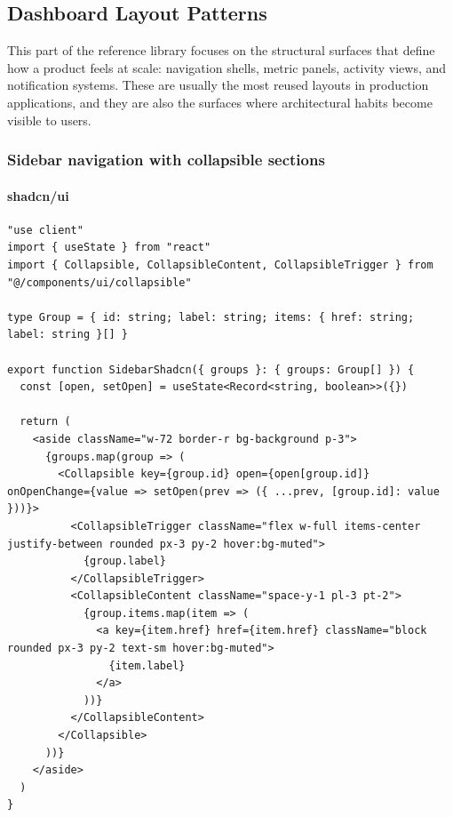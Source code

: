 \clearpage
\subsection{Dashboard Layout Patterns}

This part of the reference library focuses on the structural surfaces that define how a product feels at scale: navigation shells, metric panels, activity views, and notification systems. These are usually the most reused layouts in production applications, and they are also the surfaces where architectural habits become visible to users.

\subsubsection{Sidebar navigation with collapsible sections}
\paragraph{shadcn/ui}
\begin{verbatim}
"use client"
import { useState } from "react"
import { Collapsible, CollapsibleContent, CollapsibleTrigger } from "@/components/ui/collapsible"

type Group = { id: string; label: string; items: { href: string; label: string }[] }

export function SidebarShadcn({ groups }: { groups: Group[] }) {
  const [open, setOpen] = useState<Record<string, boolean>>({})

  return (
    <aside className="w-72 border-r bg-background p-3">
      {groups.map(group => (
        <Collapsible key={group.id} open={open[group.id]} onOpenChange={value => setOpen(prev => ({ ...prev, [group.id]: value }))}>
          <CollapsibleTrigger className="flex w-full items-center justify-between rounded px-3 py-2 hover:bg-muted">
            {group.label}
          </CollapsibleTrigger>
          <CollapsibleContent className="space-y-1 pl-3 pt-2">
            {group.items.map(item => (
              <a key={item.href} href={item.href} className="block rounded px-3 py-2 text-sm hover:bg-muted">
                {item.label}
              </a>
            ))}
          </CollapsibleContent>
        </Collapsible>
      ))}
    </aside>
  )
}
\end{verbatim}


